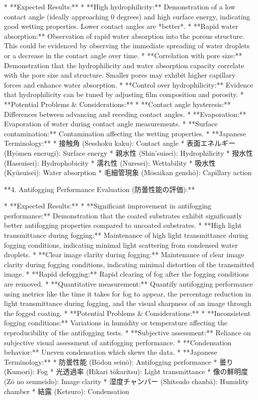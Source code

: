 \documentclass{article}
\begin{document}
*   **Expected Results:**
    *   **High hydrophilicity:**  Demonstration of a low contact angle (ideally approaching 0 degrees) and high surface energy, indicating good wetting properties.  Lower contact angles are *better*.
    *   **Rapid water absorption:**  Observation of rapid water absorption into the porous structure. This could be evidenced by observing the immediate spreading of water droplets or a decrease in the contact angle over time.
    *   **Correlation with pore size:**  Demonstration that the hydrophilicity and water absorption capacity correlate with the pore size and structure.  Smaller pores may exhibit higher capillary forces and enhance water absorption.
    *   **Control over hydrophilicity:**  Evidence that hydrophilicity can be tuned by adjusting film composition and porosity.
*   **Potential Problems & Considerations:**
    *   **Contact angle hysteresis:**  Differences between advancing and receding contact angles.
    *   **Evaporation:**  Evaporation of water during contact angle measurements.
    *   **Surface contamination:**  Contamination affecting the wetting properties.
*   **Japanese Terminology:**
    *   接触角 (Sesshoku kaku): Contact angle
    *   表面エネルギー (Hyōmen enerugī): Surface energy
    *   親水性 (Shin'suisei): Hydrophilicity
    *   撥水性 (Hassuisei): Hydrophobicity
    *   濡れ性 (Nuresei): Wettability
    *   吸水性 (Kyūsuisei): Water absorption
    *   毛細管現象 (Mōsaikan genshō): Capillary action

**4. Antifogging Performance Evaluation (防曇性能の評価):**

*   **Expected Results:**
    *   **Significant improvement in antifogging performance:**  Demonstration that the coated substrates exhibit significantly better antifogging properties compared to uncoated substrates.
    *   **High light transmittance during fogging:**  Maintenance of high light transmittance during fogging conditions, indicating minimal light scattering from condensed water droplets.
    *   **Clear image clarity during fogging:**  Maintenance of clear image clarity during fogging conditions, indicating minimal distortion of the transmitted image.
    *   **Rapid defogging:**  Rapid clearing of fog after the fogging conditions are removed.
    *   **Quantitative measurement:**  Quantify antifogging performance using metrics like the time it takes for fog to appear, the percentage reduction in light transmittance during fogging, and the visual sharpness of an image through the fogged coating.
*   **Potential Problems & Considerations:**
    *   **Inconsistent fogging conditions:**  Variations in humidity or temperature affecting the reproducibility of the antifogging tests.
    *   **Subjective assessment:**  Reliance on subjective visual assessment of antifogging performance.
    *   **Condensation behavior:** Uneven condensation which skews the data.
*   **Japanese Terminology:**
    *   防曇性能 (Bōdon seinō): Antifogging performance
    *   曇り (Kumori): Fog
    *   光透過率 (Hikari tōkaritsu): Light transmittance
    *   像の鮮明度 (Zō no senmeido): Image clarity
    *   湿度チャンバー (Shitsudo chanbā): Humidity chamber
    *   結露 (Ketsuro): Condensation
\end{document}

